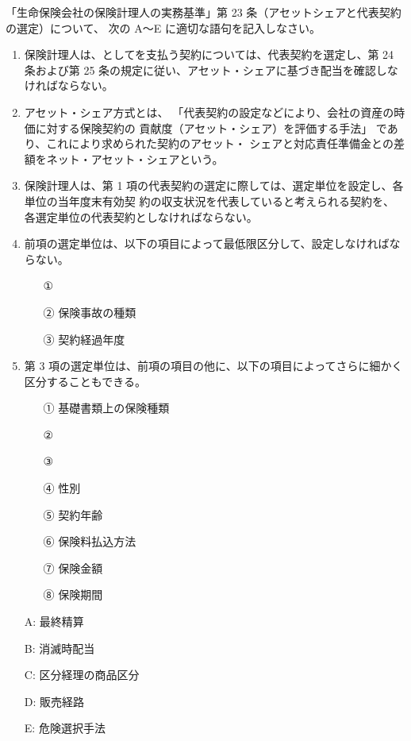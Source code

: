 \documentclass[report,gutter=10mm,fore-edge=10mm,uplatex,dvipdfmx]{jlreq}
\begin{document}
「生命保険会社の保険計理人の実務基準」第 23 条（アセットシェアと代表契約の選定）について、
次の A～E に適切な語句を記入しなさい。


\begin{enumerate}
 \item 保険計理人は、としてを支払う契約については、代表契約を選定し、第 24 条および第 25 条の規定に従い、アセット・シェアに基づき配当を確認しなければならない。
 \item 
アセット・シェア方式とは、
「代表契約の設定などにより、会社の資産の時価に対する保険契約の
貢献度（アセット・シェア）を評価する手法」 であり、これにより求められた契約のアセット・
シェアと対応責任準備金との差額をネット・アセット・シェアという。
 \item 
保険計理人は、第 1 項の代表契約の選定に際しては、選定単位を設定し、各単位の当年度末有効契
約の収支状況を代表していると考えられる契約を、各選定単位の代表契約としなければならない。
 \item 
前項の選定単位は、以下の項目によって最低限区分して、設定しなければならない。
\begin{itemize}
 \item [①] 
 \item [②] 保険事故の種類
 \item [③] 契約経過年度
\end{itemize}
 \item 
第 3 項の選定単位は、前項の項目の他に、以下の項目によってさらに細かく区分することもできる。
\begin{itemize}
 \item [①]  基礎書類上の保険種類
 \item [②] 
\item [③] 
\item [④]  性別
\item [⑤]  契約年齢
\item [⑥]  保険料払込方法
\item [⑦]  保険金額
\item [⑧]  保険期間
\end{itemize}
\end{enumerate}
\answer{}

\begin{itemize}
\item [A: ] 最終精算
\item [B: ] 消滅時配当
\item [C: ] 区分経理の商品区分
\item [D: ] 販売経路
\item [E: ] 危険選択手法
\end{itemize}
\end{document}
